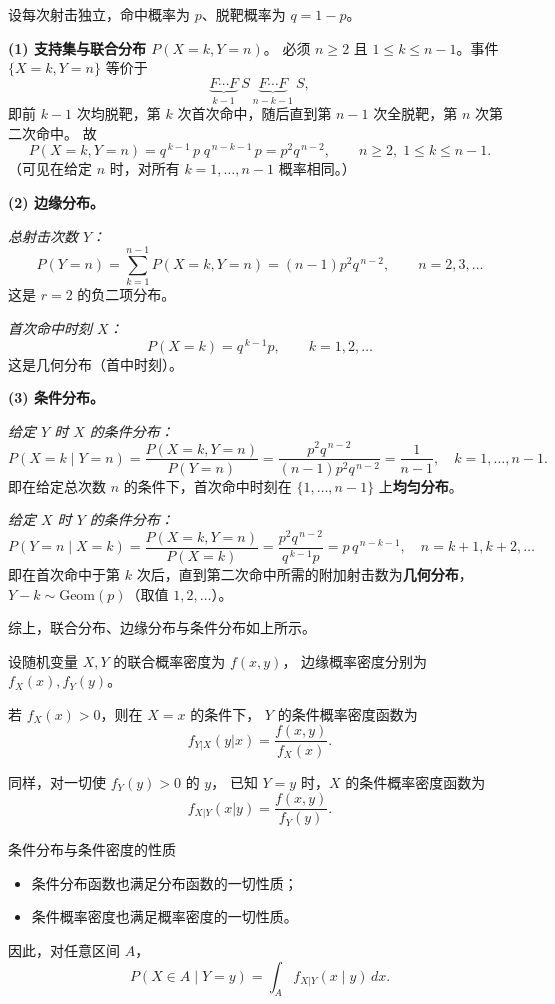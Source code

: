 \begin{solution}
设每次射击独立，命中概率为 $p$、脱靶概率为 $q=1-p$。

\medskip\noindent
\textbf{(1) 支持集与联合分布 $P(X=k,Y=n)$}。  
必须 $n\ge 2$ 且 $1\le k\le n-1$。事件 $\{X=k,Y=n\}$ 等价于
\[
\underbrace{F\cdots F}_{k-1}\ S\ \underbrace{F\cdots F}_{n-k-1}\ S,
\]
即前 $k-1$ 次均脱靶，第 $k$ 次首次命中，随后直到第 $n-1$ 次全脱靶，第 $n$ 次第二次命中。  
故
\[
P(X=k,Y=n)=q^{\,k-1}\,p\;q^{\,n-k-1}\,p
= p^{2}q^{\,n-2},\qquad n\ge 2,\;1\le k\le n-1.
\]
（可见在给定 $n$ 时，对所有 $k=1,\dots,n-1$ 概率相同。）

\medskip\noindent
\textbf{(2) 边缘分布。}

\emph{总射击次数 $Y$：}  
\[
P(Y=n)=\sum_{k=1}^{n-1} P(X=k,Y=n)=(n-1)p^{2}q^{\,n-2},
\qquad n=2,3,\dots
\]
这是 $r=2$ 的负二项分布。

\emph{首次命中时刻 $X$：}  
\[
P(X=k)=q^{\,k-1}p,\qquad k=1,2,\dots
\]
这是几何分布（首中时刻）。

\medskip\noindent
\textbf{(3) 条件分布。}

\emph{给定 $Y$ 时 $X$ 的条件分布：}
\[
P(X=k\mid Y=n)
=\frac{P(X=k,Y=n)}{P(Y=n)}
=\frac{p^{2}q^{\,n-2}}{(n-1)p^{2}q^{\,n-2}}
=\frac{1}{n-1},
\quad k=1,\dots,n-1.
\]
即在给定总次数 $n$ 的条件下，首次命中时刻在 $\{1,\dots,n-1\}$ 上\textbf{均匀分布}。

\emph{给定 $X$ 时 $Y$ 的条件分布：}
\[
P(Y=n\mid X=k)
=\frac{P(X=k,Y=n)}{P(X=k)}
=\frac{p^{2}q^{\,n-2}}{q^{\,k-1}p}
= p\,q^{\,n-k-1},
\quad n=k+1,k+2,\dots
\]
即在首次命中于第 $k$ 次后，直到第二次命中所需的附加射击数为\textbf{几何分布}，$Y-k\sim\mathrm{Geom}(p)$（取值 $1,2,\dots$）。

\medskip
综上，联合分布、边缘分布与条件分布如上所示。
\end{solution}
\begin{theorem}[条件概率密度函数]
设随机变量 $X,Y$ 的联合概率密度为 $f(x,y)$，  
边缘概率密度分别为 $f_X(x),f_Y(y)$。

若 $f_X(x)>0$，则在 $X=x$ 的条件下，  
$Y$ 的条件概率密度函数为
\[
f_{Y|X}(y|x)=\frac{f(x,y)}{f_X(x)}.
\]

同样，对一切使 $f_Y(y)>0$ 的 $y$，  
已知 $Y=y$ 时，$X$ 的条件概率密度函数为
\[
f_{X|Y}(x|y)=\frac{f(x,y)}{f_Y(y)}.
\]
\end{theorem}
\begin{remark}
条件分布与条件密度的性质
\begin{itemize}
  \item 条件分布函数也满足分布函数的一切性质；
  \item 条件概率密度也满足概率密度的一切性质。
\end{itemize}

因此，对任意区间 $A$，
\[
P(X \in A \mid Y = y)
= \int_{A} f_{X|Y}(x \mid y)\,dx .
\]
\end{remark}

